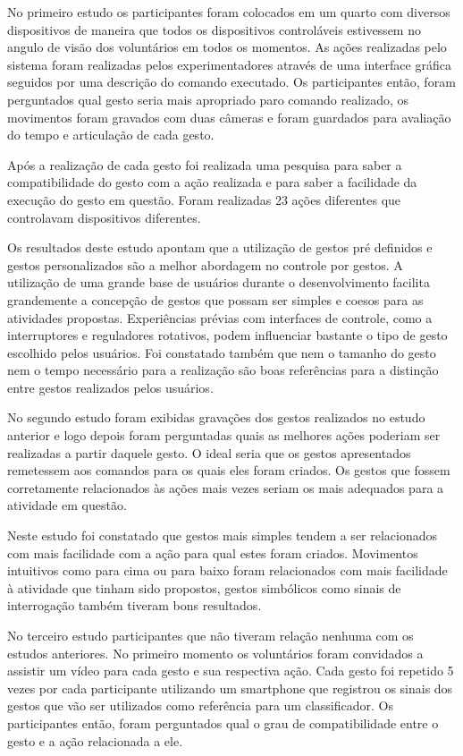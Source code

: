 No primeiro estudo os participantes foram colocados em um quarto com diversos dispositivos de maneira que todos os dispositivos controláveis estivessem no angulo de visão dos voluntários em todos os momentos. As ações realizadas pelo sistema foram realizadas pelos experimentadores através de uma interface gráfica seguidos por uma descrição do comando executado. Os participantes então, foram perguntados qual gesto seria mais apropriado paro comando realizado, os movimentos foram gravados com duas câmeras e foram guardados para avaliação do tempo e articulação de cada gesto.

Após a realização de cada gesto foi realizada uma pesquisa para saber a compatibilidade do gesto com a ação realizada e para saber a facilidade da execução do gesto em questão. Foram realizadas 23 ações diferentes que controlavam dispositivos diferentes.

Os resultados deste estudo apontam que a utilização de gestos pré definidos e gestos personalizados são a melhor abordagem no controle por gestos. A utilização de uma grande base de usuários durante o desenvolvimento facilita grandemente a concepção de gestos que possam ser simples e coesos para as atividades propostas. Experiências prévias com interfaces de controle, como a interruptores e reguladores rotativos, podem influenciar bastante o tipo de gesto escolhido pelos usuários. Foi constatado também que nem o tamanho do gesto nem o tempo necessário para a realização são boas referências para a distinção entre gestos realizados pelos usuários. 

No segundo estudo foram exibidas gravações dos gestos realizados no estudo anterior e logo depois foram perguntadas quais as melhores ações poderiam ser realizadas a partir daquele gesto. O ideal seria que os gestos apresentados remetessem aos comandos para os quais eles foram criados. Os gestos que fossem corretamente relacionados às ações mais vezes seriam os mais adequados para a atividade em questão. 

Neste estudo foi constatado que gestos mais simples tendem a ser relacionados com mais facilidade com a ação para qual estes foram criados. Movimentos intuitivos como para cima ou para baixo foram relacionados com mais facilidade à atividade que tinham sido propostos, gestos simbólicos como sinais de interrogação também tiveram bons resultados.

No terceiro estudo participantes que não tiveram relação nenhuma com os estudos anteriores. No primeiro momento os voluntários foram convidados a assistir um vídeo para cada gesto e sua respectiva ação. Cada gesto foi repetido 5 vezes por cada participante utilizando um smartphone que registrou os sinais dos gestos que vão ser utilizados como referência para um classificador. Os participantes então, foram perguntados qual o grau de compatibilidade entre o gesto e a ação relacionada a ele.

